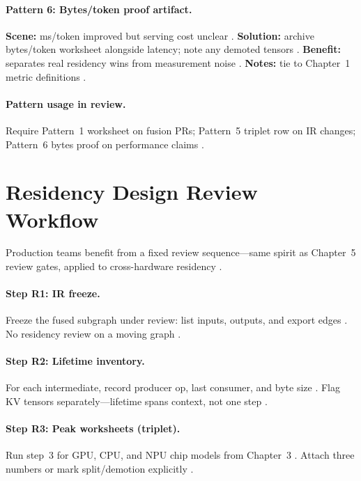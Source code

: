 \paragraph{Pattern 6: Bytes/token proof artifact.}
\textbf{Scene:} ms/token improved but serving cost unclear \citep{memoryfloor2026,taxbreak2026}.
\textbf{Solution:} archive bytes/token worksheet alongside latency; note any demoted tensors \citep{patel2025llminference,yirage2026}.
\textbf{Benefit:} separates real residency wins from measurement noise \citep{dao2022flashattention,memoryfloor2026}.
\textbf{Notes:} tie to Chapter~1 metric definitions \citep{taxbreak2026}.

\paragraph{Pattern usage in review.}
Require Pattern~1 worksheet on fusion PRs; Pattern~5 triplet row on IR changes; Pattern~6 bytes proof on performance claims \citep{yirage2026,chen2020compilerbasedhardw,patel2025llminference}.

\section{Residency Design Review Workflow}
\label{sec:ch06_residency_review}

Production teams benefit from a fixed review sequence---same spirit as Chapter~5 review gates, applied to cross-hardware residency \citep{patel2025llminference,yirage2026,amd2024xdna}.

\paragraph{Step R1: IR freeze.}
Freeze the fused subgraph under review: list inputs, outputs, and export edges \citep{chen2020compilerbasedhardw,taxbreak2026}.
No residency review on a moving graph \citep{wu2024mirage,yirage2026}.

\paragraph{Step R2: Lifetime inventory.}
For each intermediate, record producer op, last consumer, and byte size \citep{rotem2018glow,dlbook}.
Flag KV tensors separately---lifetime spans context, not one step \citep{kwon2023vllm,dao2023flashdecoding}.

\paragraph{Step R3: Peak worksheets (triplet).}
Run step~3 for GPU, CPU, and NPU chip models from Chapter~3 \citep{chen2020compilerbasedhardw,nvidia2022hopper,amd2024aie}.
Attach three numbers or mark split/demotion explicitly \citep{yirage2026,memoryfloor2026}.

